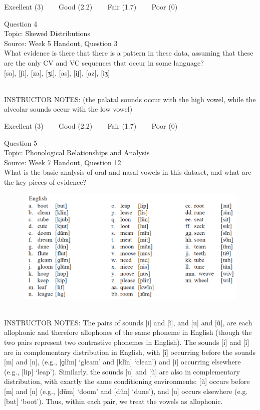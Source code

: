 \documentclass[12pt]{article}
\begin{document}
\vfill
Excellent (3) ~~~ Good (2.2) ~~~ Fair (1.7) ~~~ Poor (0)
\newpage

{\large Question 4}\\

Topic: Skewed Distributions\\
Source: Week 5 Handout, Question 3\\

What evidence is there that there is a pattern in these data, assuming that these are the only CV and VC sequences that occur in some language?\\

{[sa]}, {[ʃi]}, {[za]}, {[ʒi]}, {[as]}, {[iʃ]}, {[az]}, {[iʒ]}


~\\
INSTRUCTOR NOTES: (the palatal sounds occur with the high vowel, while the alveolar sounds occur with the low vowel)


\vfill
Excellent (3) ~~~ Good (2.2) ~~~ Fair (1.7) ~~~ Poor (0)
\newpage

{\large Question 5}\\

Topic: Phonological Relationships and Analysis\\
Source: Week 7 Handout, Question 12\\

What is the basic analysis of oral and nasal vowels in this dataset, and what are the key pieces of evidence?\\

\begin{figure}[H]
\includegraphics{../images/english12.png}
\end{figure}

~\\
INSTRUCTOR NOTES: The pairs of sounds [i] and [ĩ], and [u] and [ũ], are each allophonic and therefore allophones of the same phoneme in English (though the two pairs represent two contrastive phonemes in English). The sounds [i] and [ĩ] are in complementary distribution in English, with [ĩ] occurring before the sounds [m] and [n], (e.g., [ɡlĩm] ‘gleam’ and [klĩn] ‘clean’) and [i] occurring elsewhere (e.g., [lip] ‘leap’). Similarly, the sounds [u] and [ũ] are also in complementary distribution, with exactly the same conditioning environments: [ũ] occurs before [m] and [n] (e.g., [dũm] ‘doom’ and [dũn] ‘dune’), and [u] occurs elsewhere (e.g. [but] ‘boot’). Thus, within each pair, we treat the vowels as allophonic. 
\end{document}
